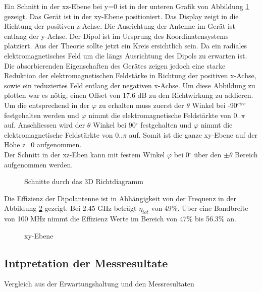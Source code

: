 Ein Schnitt in der xz-Ebene bei y=0 ist in der unteren Grafik von Abbildung \ref{fig:Schnittgemessen} gezeigt. Das Gerät ist in der xy-Ebene positioniert. Das Display zeigt in die Richtung der positiven z-Achse. Die Ausrichtung der Antenne im Gerät ist entlang der y-Achse. Der Dipol ist im Ursprung des Koordinatensystems platziert. Aus der Theorie sollte jetzt ein Kreis ersichtlich sein. Da ein radiales elektromagnetisches Feld um die längs Ausrichtung des Dipols zu erwarten ist. Die absorbierenden Eigenschaften des Gerätes zeigen jedoch eine starke Reduktion der elektromagnetischen Feldstärke in Richtung der positiven x-Achse, sowie ein reduziertes Feld entlang der negativen x-Achse. Um diese Abbildung zu plotten war es nötig, einen Offset von 17.6 dB zu den Richtwirkung zu addieren.\\
Um die entsprechend in der $\varphi$ zu erhalten muss zuerst der $\theta$ Winkel bei -90$^{circ}$ festgehalten werden und $\varphi$ nimmt die elektromagnetische Feldstärkte von $0..\pi$ auf. Anschliessen wird der $\theta$ Winkel bei 90$^{\circ}$ festgehalten  und $\varphi$ nimmt die elektromagnetische Feldstärkte von $0..\pi$ auf. Somit ist die ganze xy-Ebene auf der Höhe z=0 aufgenommen.\\
Der Schnitt in der xz-Eben kann mit festem Winkel $\varphi$ bei 0$^{\circ}$ über den  $\pm \theta$ Bereich aufgenommen werden.
\begin{figure}[!h]
	\centering
	\begingroup
	
	\endgroup
	\caption{Schnitte durch das 3D Richtdiagramm}
	\label{fig:Schnittgemessen}
\end{figure}
\newpage
Die Effizienz der Dipolantenne ist in Abhängigkeit von der Frequenz in der Abbildung \ref{fig:Effizienz_gemessen} gezeigt. Bei 2.45 GHz beträgt $\eta_{tot}$ von 49$\%$. Über eine Bandbreite von 100 MHz nimmt die Effizienz Werte im Bereich von 47$\%$ bis 56.3$\%$ an.\\
\begin{figure}[!h]
	\centering
	\begingroup
	
	\endgroup
	\caption{xy-Ebene}\label{fig:Effizienz_gemessen}
\end{figure}

\subsection{Intpretation der Messresultate}
Vergleich aus der Erwartungshaltung und den Messresultaten

